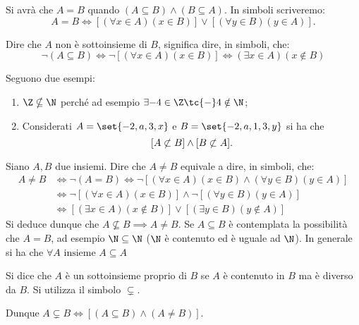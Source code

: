 \begin{remark}
    Si avrà che \(A = B\) quando \((A \subseteq B) \land (B \subseteq A)\). In simboli scriveremo:
    \[
        A = B \iff \left[(\forall x \in A) (x \in B)\right] \lor \left[(\forall y \in B) (y \in A)\right].
    \]
\end{remark}

\begin{remark}
    Dire che \(A\) non è sottoinsieme di \(B\), significa dire, in simboli, che:
    \[
        \neg(A \subseteq B) \iff \neg \left[(\forall x \in A) (x \in B)\right]
                            \iff (\exists x \in A) (x \notin B)
    \]
\end{remark}

\begin{examples}
Seguono due esempi:
    \begin{enumerate}
        \item \(\Z \nsubseteq \N\) perché ad esempio \(\exists {-}4 \in \Z \tc {-}4 \notin \N\);
        \item Considerati \(A = \set{-2, a, 3, x}\) e \(B = \set{-2, a, 1, 3, y}\) si ha che
        \[
            [A \centernot\subset B] \land [B \centernot\subset A].
        \]
    \end{enumerate}
\end{examples}


Siano \(A,B\) due insiemi. Dire che \(A \neq B\) equivale a dire, in simboli, che:
\begin{equation*}
    \begin{split}
        A \neq B &\iff \neg(A = B)
                  \iff \neg[(\forall x \in A) (x \in B) \land (\forall y \in B) (y \in A)]         \\
                 &\iff \neg[(\forall x \in A) (x \in B)] \land \neg[(\forall y \in B) (y \in A)]   \\
                 &\iff [(\exists x \in A)(x \notin B)] \lor [(\exists y \in B)(y \notin A)]
    \end{split}
\end{equation*}
Si deduce dunque che \(A \nsubseteq B \implies A \neq B\). Se \(A \subseteq B\) è contemplata la possibilità che \(A = B\), ad esempio \(\N \subseteq \N\) (\(\N\) è contenuto ed è uguale ad \(\N\)). In generale si ha che \(\forall A \text{ insieme } A \subseteq A\)


\begin{definition}\label{def:sottoinsieme_proprio}
    Si dice che \(A\) è un sottoinsieme proprio di \(B\) se \(A\) è contenuto in \(B\) ma è diverso da \(B\). Si utilizza il simbolo \(\subsetneq\).
\end{definition}
Dunque \(A \subsetneq B \iff \left[(A \subseteq B) \land (A \neq B)\right]\).

